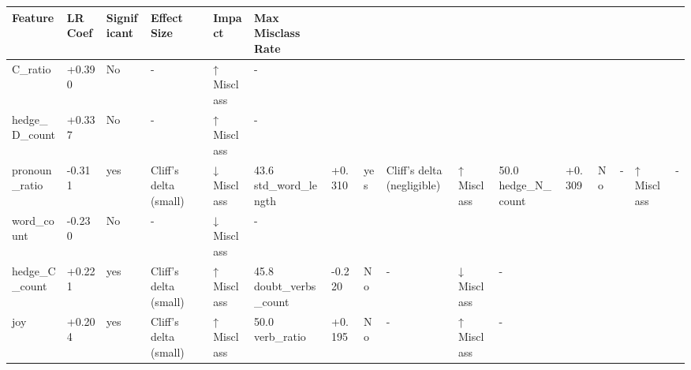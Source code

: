 \begin{tabular}{llllll}
\toprule
Feature & LR Coef & Significant & Effect Size & Impact & Max Misclass Rate \\
\midrule
C_ratio & +0.390 & No & - & ↑ Misclass & - \\
hedge_D_count & +0.337 & No & - & ↑ Misclass & - \\
pronoun_ratio & -0.311 & yes & Cliff's delta (small) & ↓ Misclass & 43.6%
std_word_length & +0.310 & yes & Cliff's delta (negligible) & ↑ Misclass & 50.0%
hedge_N_count & +0.309 & No & - & ↑ Misclass & - \\
word_count & -0.230 & No & - & ↓ Misclass & - \\
hedge_C_count & +0.221 & yes & Cliff's delta (small) & ↑ Misclass & 45.8%
doubt_verbs_count & -0.220 & No & - & ↓ Misclass & - \\
joy & +0.204 & yes & Cliff's delta (small) & ↑ Misclass & 50.0%
verb_ratio & +0.195 & No & - & ↑ Misclass & - \\
\bottomrule
\end{tabular}
